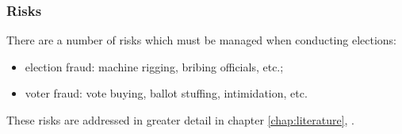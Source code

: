 \subsubsection{Risks}
There are a number of risks which must be managed when conducting elections:

\begin{itemize}
  \item election fraud: machine rigging, bribing officials, etc.;
  \item voter fraud: vote buying, ballot stuffing, intimidation, etc.
\end{itemize}

These risks are addressed in greater detail in chapter \ref{chap:literature},
\emph{}.
